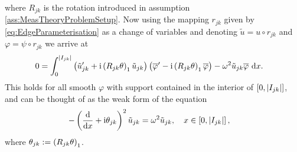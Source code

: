 where $R_{jk}$ is the rotation introduced in assumption \ref{ass:MeasTheoryProblemSetup}.
Now using the mapping $r_{jk}$ given by \eqref{eq:EdgeParameterisation} as a change of variables and denoting $\tilde{u} = u \circ r_{jk}$ and $\varphi = \psi\circ r_{jk}$ we arrive at
\begin{align*}
	0 &= \int_{0}^{\left\lvert I_{jk} \right\rvert} \left( \tilde{u}_{jk}' + \mathrm{i}\left( R_{jk}\theta \right)_1 \tilde{u}_{jk} \right)\left( \overline{\varphi}' - \mathrm{i}\left( R_{jk}\theta \right)_1 \overline{\varphi}  \right) - \omega^2 \tilde{u}_{jk}\overline{\varphi} \ \mathrm{d} x .
\end{align*}
This holds for all smooth $\varphi$ with support contained in the interior of $\left[ 0,\left\lvert I_{jk} \right\rvert \right]$, and can be thought of as the weak form of the equation
\begin{align*}
	-\left( \dfrac{\mathrm{d}}{\mathrm{d}x} + \mathrm{i}\theta_{jk} \right)^2 \tilde{u}_{jk} &= \omega^2 \tilde{u}_{jk}, \quad x\in\left[ 0,\left\lvert I_{jk} \right\rvert \right],
\end{align*}
where $\theta_{jk} := \left( R_{jk}\theta \right)_1$.

